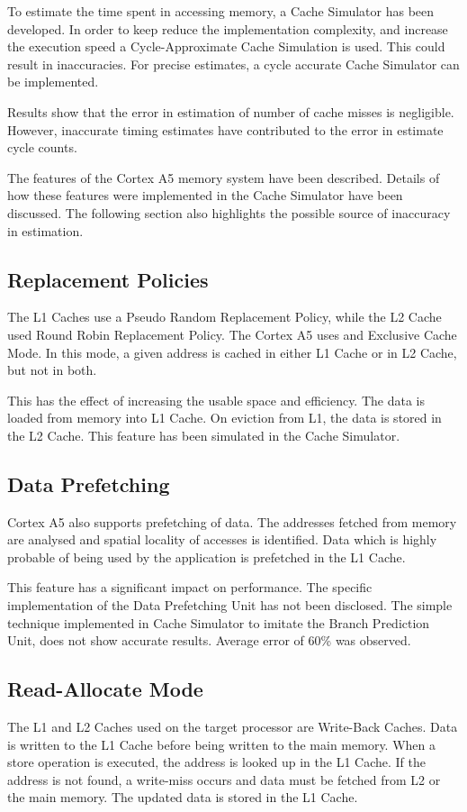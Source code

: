 To estimate the time spent in accessing memory, a Cache Simulator has been developed. In order to keep reduce the implementation complexity, and increase the execution speed a Cycle-Approximate Cache Simulation is used. This could result in inaccuracies. For precise estimates, a cycle accurate Cache Simulator can be implemented. 

Results show that the error in estimation of number of cache misses is negligible. However, inaccurate timing estimates have contributed to the error in estimate cycle counts. 

The features of the Cortex A5 memory system have been described. Details of how these features were implemented in the Cache Simulator have been discussed. The following section also highlights the possible source of inaccuracy in estimation.

\subsection{Replacement Policies}
The L1 Caches use a Pseudo Random Replacement Policy, while the L2 Cache used Round Robin Replacement Policy. The Cortex A5 uses and Exclusive Cache Mode. In this mode, a given address is cached in either L1 Cache or in L2 Cache, but not in both. 

This has the effect of increasing the usable space and efficiency. The data is loaded from memory into L1 Cache. On eviction from L1, the data is stored in the L2 Cache. This feature has been simulated in the Cache Simulator.

\subsection{Data Prefetching}
Cortex A5 also supports prefetching of data. The addresses fetched from memory are analysed and spatial locality of accesses is identified. Data which is highly probable of being used by the application is prefetched in the L1 Cache.

This feature has a significant impact on performance. The specific implementation of the Data Prefetching Unit has not been disclosed. The simple technique implemented in Cache Simulator to imitate the Branch Prediction Unit, does not show accurate results. Average error of 60\% was observed. 

\subsection{Read-Allocate Mode}
The L1 and L2 Caches used on the target processor are Write-Back Caches. Data is written to the L1 Cache before being written to the main memory. When a store operation is executed, the address is looked up in the L1 Cache. If the address is not found, a write-miss occurs and data must be fetched from L2 or the main memory. The updated data is stored in the L1 Cache. 

